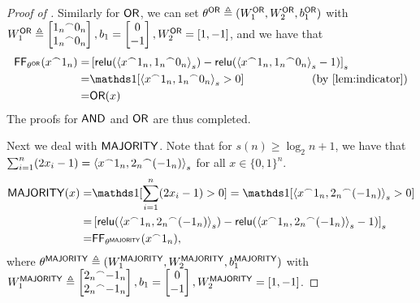 \begin{proof}[Proof of ]
	Similarly for $\mathsf{OR}$, we can set $\theta^{\mathsf{OR}}\triangleq (W_1^{\mathsf{OR}},W_2^{\mathsf{OR}},b_1^{\mathsf{OR}})$ with $W_1^{\mathsf{OR}}\triangleq \begin{bmatrix}
		{1_n}^\frown{0_n} \\
		{1_n}^\frown{0_n}
	\end{bmatrix} , b_1 = \begin{bmatrix}
		0\\
		-1
	\end{bmatrix}, W_2^{\mathsf{OR}} = [1,-1]$, and we have that 
	\begin{align}
		\FF_{\theta^\OR}(\interleave{x}{1_n}) = &\rds{\relu(\inner{\interleave{x}{1_n}}{\interleave{1_n}{0_n}}_s) - \relu(\inner{\interleave{x}{1_n}}{\interleave{1_n}{0_n}}_s-1)} \notag\\
		= &  \ind[\inner{\interleave{x}{1_n}}{\interleave{1_n}{0_n}}_s>0] \qquad\qquad\qquad\text{(by \Cref{lem:indicator})} \notag\\
		= & \OR(x)\notag
	\end{align}
	The proofs for $\mathsf{AND}$ and $\mathsf{OR}$ are thus completed.
	
	Next we deal with $\mathsf{MAJORITY}$. Note that for $s(n)\ge \log_2 n +1$, we have that $\sum_{i=1}^n (2x_i-1) = \left\langle {x}^\frown{1_n},{2_n}^\frown{(-1_n)} \right\rangle_s $ for all $x\in\{0,1\}^n$. 
	\begin{align}
	\MAJORITY(x) = &\ind[\sum_{i=1}^n (2x_i-1)>0]  = \ind[\inner{\interleave{x}{1_n}}{\interleave{2_n}{(-1_n)}}_s>0]\notag \\
	= & \rds{\relu(\inner{\interleave{x}{1_n}}{\interleave{2_n}{(-1_n)}}_s) - \relu(\inner{\interleave{x}{1_n}}{\interleave{2_n}{(-1_n)}}_s-1)} \notag\\
	= & \FF_{\theta^\MAJORITY}(\interleave{x}{1_n}),
	\end{align}
where  $\theta^{\mathsf{MAJORITY}}\triangleq (W_1^{\mathsf{MAJORITY}},W_2^{\mathsf{MAJORITY}},b_1^{\mathsf{MAJORITY}})$ with $W_1^{\mathsf{MAJORITY}}\triangleq \begin{bmatrix}
		{2_n}^\frown{-1_n} \\
		{2_n}^\frown{-1_n}
	\end{bmatrix} , b_1 = \begin{bmatrix}
		0\\
		-1
	\end{bmatrix}, W_2^{\mathsf{MAJORITY}} = [1,-1]$.
\end{proof}


